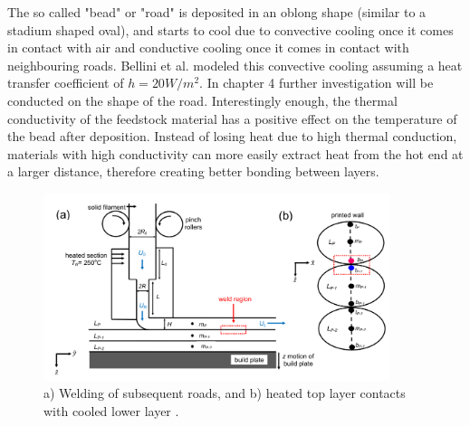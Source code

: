 The so called "bead" or "road" is deposited in an oblong shape (similar to a stadium shaped oval), and starts to cool due to convective cooling once it comes in contact with air and conductive cooling once it comes in contact with neighbouring roads. Bellini et al. \cite{Bellini2003MechanicalModeling} modeled this convective cooling assuming a heat transfer coefficient of $h =20 W/m^2$. In chapter 4  further investigation will be conducted on the shape of the road. Interestingly enough, the thermal conductivity of the feedstock material has a positive effect on the temperature of the bead after deposition. Instead of losing heat due to high thermal conduction, materials with high conductivity can more easily extract heat from the hot end at a larger distance, therefore creating better bonding between layers. 

\begin{figure}[htb]
    \centering
    \includegraphics[width=0.9\textwidth]{chapter_2/figures/welding.png}
    \caption{a) Welding of subsequent roads, and b) heated top layer contacts with cooled lower layer \cite{McIlroy2017DeformationManufacturing}.
    \label{fig:welding}}
\end{figure}

